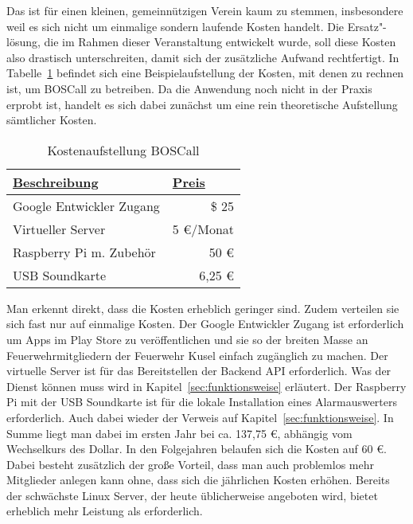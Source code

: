 Das ist für einen kleinen, gemeinnützigen Verein kaum zu stemmen, insbesondere weil es sich nicht um einmalige sondern laufende Kosten handelt. Die Ersatz"-lösung, die im Rahmen dieser Veranstaltung entwickelt wurde, soll diese Kosten also drastisch unterschreiten, damit sich der zusätzliche Aufwand rechtfertigt. In Tabelle~\ref{tbl:BOSCallPricing} befindet sich eine Beispielaufstellung der Kosten, mit denen zu rechnen ist, um BOSCall zu betreiben. Da die Anwendung noch nicht in der Praxis erprobt ist, handelt es sich dabei zunächst um eine rein theoretische Aufstellung sämtlicher Kosten.

\begin{table}[]
	\centering
	\caption{Kostenaufstellung BOSCall}
	\label{tbl:BOSCallPricing}
	\begin{tabular}{|l|r|}
		\hline
		{\ul \textbf{Beschreibung}} & \multicolumn{1}{l|}{{\ul \textbf{Preis}}} \\ \hline
		Google Entwickler Zugang    & \$ 25                                     \\ \hline
		Virtueller Server           & 5 €/Monat                                 \\ \hline
		Raspberry Pi m. Zubehör     & 50 €                                      \\ \hline
		USB Soundkarte              & 6,25 €                                    \\ \hline
	\end{tabular}
\end{table}

Man erkennt direkt, dass die Kosten erheblich geringer sind. Zudem verteilen sie sich fast nur auf einmalige Kosten. Der Google Entwickler Zugang ist erforderlich um Apps im Play Store zu veröffentlichen und sie so der breiten Masse an Feuerwehrmitgliedern der Feuerwehr Kusel einfach zugänglich zu machen. Der virtuelle Server ist für das Bereitstellen der Backend API erforderlich. Was der Dienst können muss wird in Kapitel~\ref{sec:funktionsweise} erläutert.  Der Raspberry Pi mit der USB Soundkarte ist für die lokale Installation eines Alarmauswerters erforderlich. Auch dabei wieder der Verweis auf Kapitel~\ref{sec:funktionsweise}. In Summe liegt man dabei im ersten Jahr bei ca. 137,75 €, abhängig vom Wechselkurs des Dollar. In den Folgejahren belaufen sich die Kosten auf 60 €. Dabei besteht zusätzlich der große Vorteil, dass man auch problemlos mehr Mitglieder anlegen kann ohne, dass sich die jährlichen Kosten erhöhen. Bereits der schwächste Linux Server, der heute üblicherweise angeboten wird, bietet erheblich mehr Leistung als erforderlich.